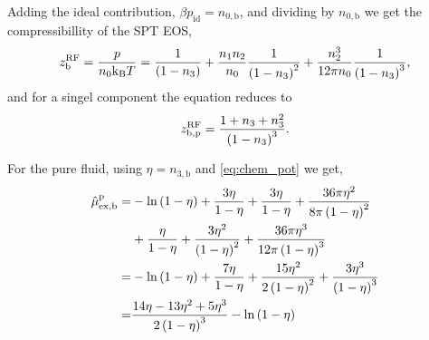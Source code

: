 \documentclass[12pt, letterpaper]{article}
\newcommand*{\lb}{\ensuremath{\left(}}
\newcommand*{\rb}{\ensuremath{\right)}}
\newcommand{\RF}{\ensuremath{\text{RF}}\xspace}
\newcommand{\excess}{\ensuremath{\text{ex}}\xspace}
\newcommand{\ideal}{\ensuremath{\text{id}}\xspace}
\newcommand{\kB}{\ensuremath{\text{k}_{\text{B}}}\xspace}
\newcommand{\bulk}{\ensuremath{\text{b}}\xspace}
\newcommand{\pure}{\ensuremath{\text{p}}\xspace}
\begin{document}
Adding the ideal contribution, $\beta p_{\ideal} = n_{0,\bulk}$, and
dividing by $n_{0,\bulk}$ we get the compressibillity of the SPT EOS,
\begin{equation}
  z^\RF_\bulk = \frac{p}{n_0 \kB T} = \frac{1}{\lb 1 - n_3 \rb} + \frac{n_1 n_2}{n_0} \frac{1}{\lb 1 - n_3 \rb^2} + \frac{n_2^3}{12 \pi n_0} \frac{1}{\lb 1 - n_3 \rb^3},
\end{equation}
and for a singel component the equation reduces to
\begin{equation}
  z^\RF_{\bulk,\pure} = \frac{1 + n_3 + n_3^2}{\lb 1 - n_3 \rb^3}.
\end{equation}

For the pure fluid, using $\eta = n_{3,\bulk}$ and \eqref{eq:chem_pot} we get,
\begin{align}
  \hat{\mu}^\pure_{\excess,\bulk} =& -\ln \lb 1 - \eta \rb + \frac{3 \eta}{1 - \eta} + \frac{3 \eta}{1 - \eta} + \frac{36\pi\eta^2}{8\pi \lb 1 - \eta \rb^2}\nonumber \\
  & +\frac{\eta}{1 - \eta} +
  \frac{3 \eta^2}{\lb 1 - \eta \rb^2} +
    \frac{36\pi\eta^3}{12\pi \lb 1 - \eta \rb^3}\nonumber \\
   =&-\ln \lb 1 - \eta \rb + \frac{7 \eta}{1 - \eta} + \frac{15\eta^2}{2\lb 1 - \eta \rb^2}+
      \frac{3\eta^3}{\lb 1 - \eta \rb^3}\nonumber \\
  =&\frac{14\eta - 13\eta^2 + 5\eta^3}{2\lb 1 - \eta \rb^3}-\ln \lb 1 - \eta \rb
\end{align}


\clearpage


\end{document}
